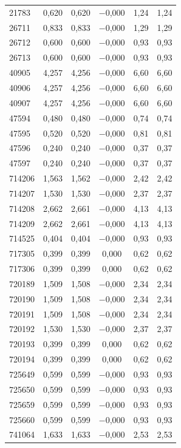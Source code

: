 \begin{longtable}{lccccc}
21783 & 0,620 & 0,620 & $-$0,000 & 1,24 & 1,24 \\
26711 & 0,833 & 0,833 & $-$0,000 & 1,29 & 1,29 \\
26712 & 0,600 & 0,600 & $-$0,000 & 0,93 & 0,93 \\
26713 & 0,600 & 0,600 & $-$0,000 & 0,93 & 0,93 \\
40905 & 4,257 & 4,256 & $-$0,000 & 6,60 & 6,60 \\
40906 & 4,257 & 4,256 & $-$0,000 & 6,60 & 6,60 \\
40907 & 4,257 & 4,256 & $-$0,000 & 6,60 & 6,60 \\
47594 & 0,480 & 0,480 & $-$0,000 & 0,74 & 0,74 \\
47595 & 0,520 & 0,520 & $-$0,000 & 0,81 & 0,81 \\
47596 & 0,240 & 0,240 & $-$0,000 & 0,37 & 0,37 \\
47597 & 0,240 & 0,240 & $-$0,000 & 0,37 & 0,37 \\
714206 & 1,563 & 1,562 & $-$0,000 & 2,42 & 2,42 \\
714207 & 1,530 & 1,530 & $-$0,000 & 2,37 & 2,37 \\
714208 & 2,662 & 2,661 & $-$0,000 & 4,13 & 4,13 \\
714209 & 2,662 & 2,661 & $-$0,000 & 4,13 & 4,13 \\
714525 & 0,404 & 0,404 & $-$0,000 & 0,93 & 0,93 \\
717305 & 0,399 & 0,399 & 0,000 & 0,62 & 0,62 \\
717306 & 0,399 & 0,399 & 0,000 & 0,62 & 0,62 \\
720189 & 1,509 & 1,508 & $-$0,000 & 2,34 & 2,34 \\
720190 & 1,509 & 1,508 & $-$0,000 & 2,34 & 2,34 \\
720191 & 1,509 & 1,508 & $-$0,000 & 2,34 & 2,34 \\
720192 & 1,530 & 1,530 & $-$0,000 & 2,37 & 2,37 \\
720193 & 0,399 & 0,399 & 0,000 & 0,62 & 0,62 \\
720194 & 0,399 & 0,399 & 0,000 & 0,62 & 0,62 \\
725649 & 0,599 & 0,599 & $-$0,000 & 0,93 & 0,93 \\
725650 & 0,599 & 0,599 & $-$0,000 & 0,93 & 0,93 \\
725659 & 0,599 & 0,599 & $-$0,000 & 0,93 & 0,93 \\
725660 & 0,599 & 0,599 & $-$0,000 & 0,93 & 0,93 \\
741064 & 1,633 & 1,633 & $-$0,000 & 2,53 & 2,53 \\

\end{longtable}
